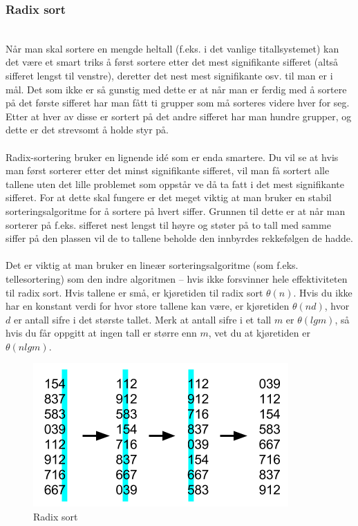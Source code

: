 \subsubsection{Radix sort}\\
Når man skal sortere en mengde heltall (f.eks. i det vanlige titallsystemet) kan det være et smart triks å først sortere etter det mest signifikante sifferet (altså sifferet lengst til venstre), deretter det nest mest signifikante osv. til man er i mål. Det som ikke er så gunstig med dette er at når man er ferdig med å sortere på det første sifferet har man fått ti grupper som må sorteres videre hver for seg. Etter at hver av disse er sortert på det andre sifferet har man hundre grupper, og dette er det strevsomt å holde styr på.
\\\\
Radix-sortering bruker en lignende idé som er enda smartere. Du vil se at hvis man først sorterer etter det minst signifikante sifferet, vil man få sortert alle tallene uten det lille problemet som oppstår ve då ta fatt i det mest signifikante sifferet. For at dette skal fungere er det meget viktig at man bruker en stabil sorteringsalgoritme for å sortere på hvert siffer. Grunnen til dette er at når man sorterer på f.eks. sifferet nest lengst til høyre og støter på to tall med samme siffer på den plassen vil de to tallene beholde den innbyrdes rekkefølgen de hadde.
\\\\
Det er viktig at man bruker en lineær sorteringsalgoritme (som f.eks. tellesortering) som den indre algoritmen – hvis ikke forsvinner hele effektiviteten til radix sort. Hvis tallene er små, er kjøretiden til radix sort $\theta(n)$. Hvis du ikke har en konstant verdi for hvor store tallene kan være, er kjøretiden $\theta(nd)$, hvor $d$ er antall sifre i det største tallet. Merk at antall sifre i et tall $m$ er $\theta(lg m)$, så hvis du får oppgitt at ingen tall er større enn $m$, vet du at kjøretiden er $\theta(n lg m)$. 

\begin{figure}[H]
\includegraphics[scale=0.7]{images/radixsort}
\centering %
\caption{Radix sort}
\label{fig:radixsort}
\end{figure}

